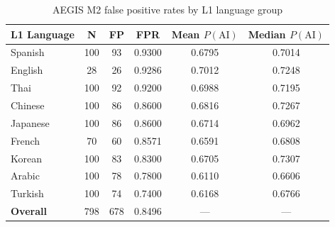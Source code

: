 \begin{table}[ht]
\centering
\caption{AEGIS M2 false positive rates by L1 language group}
\label{tab:fairness}
\begin{tabular}{lccccc}
\hline
\textbf{L1 Language} & \textbf{N} & \textbf{FP} & \textbf{FPR} & \textbf{Mean $P(\text{AI})$} & \textbf{Median $P(\text{AI})$} \\
\hline
Spanish & 100 & 93 & 0.9300 & 0.6795 & 0.7014 \\
English & 28 & 26 & 0.9286 & 0.7012 & 0.7248 \\
Thai & 100 & 92 & 0.9200 & 0.6988 & 0.7195 \\
Chinese & 100 & 86 & 0.8600 & 0.6816 & 0.7267 \\
Japanese & 100 & 86 & 0.8600 & 0.6714 & 0.6962 \\
French & 70 & 60 & 0.8571 & 0.6591 & 0.6808 \\
Korean & 100 & 83 & 0.8300 & 0.6705 & 0.7307 \\
Arabic & 100 & 78 & 0.7800 & 0.6110 & 0.6606 \\
Turkish & 100 & 74 & 0.7400 & 0.6168 & 0.6766 \\
\hline
\textbf{Overall} & 798 & 678 & 0.8496 & — & — \\
\hline
\end{tabular}
\end{table}